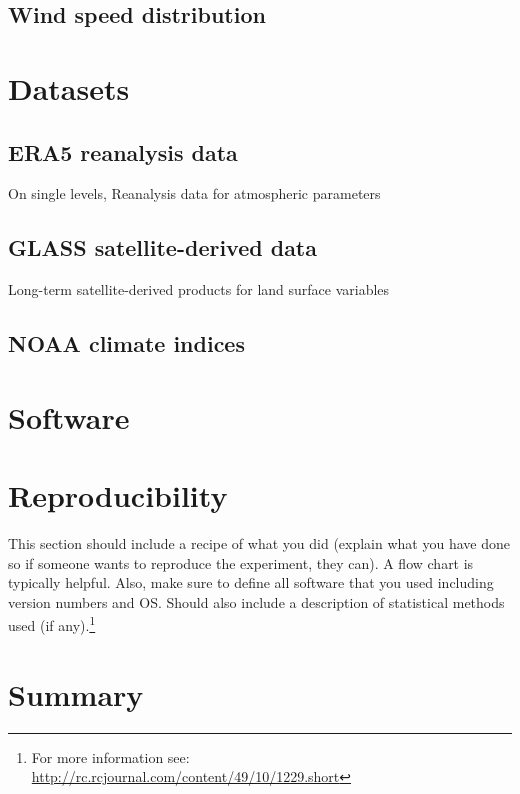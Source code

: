 \subsection{Wind speed distribution}

\section{Datasets}

\subsection{ERA5 reanalysis data}

On single levels, Reanalysis data for atmospheric parameters

\subsection{GLASS satellite-derived data}

Long-term satellite-derived products for land surface variables

\subsection{NOAA climate indices}

\section{Software}

\section{Reproducibility}

This section should include a recipe of what you did (explain what you have done so if someone wants to reproduce the experiment, they can).  A flow chart is typically helpful.  Also, make sure to define all software that you used including version numbers and OS.  Should also include a description of statistical methods used (if any).\footnote{For more information see: \url{http://rc.rcjournal.com/content/49/10/1229.short}}

\blindtext

\section*{Summary}
\blindtext